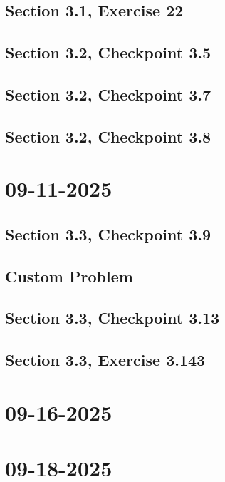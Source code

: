 \documentclass[]{mangos-musings}
\begin{document}
\subsection{Section 3.1, Exercise 22}

\subsection{Section 3.2, Checkpoint 3.5}

\subsection{Section 3.2, Checkpoint 3.7}

\subsection{Section 3.2, Checkpoint 3.8}

\newpage
\section{09-11-2025}
\subsection{Section 3.3, Checkpoint 3.9}

\subsection{Custom Problem}


\subsection{Section 3.3, Checkpoint 3.13}

\subsection{Section 3.3, Exercise 3.143}

\newpage
\section{09-16-2025}

\newpage
\section{09-18-2025}
\end{document}
